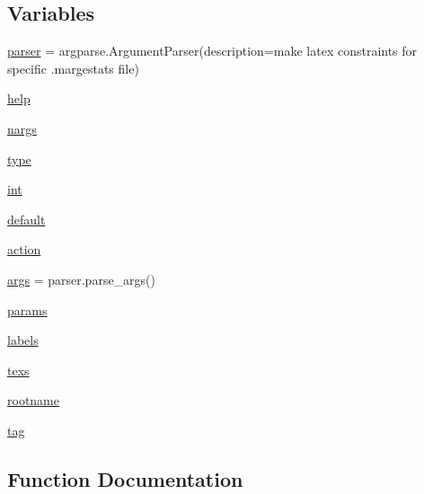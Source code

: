 \subsection*{Variables}
\begin{DoxyCompactItemize}
\item 
\mbox{\hyperlink{namespacemakeLatex_ad3a67b9142b2728f716b8460ccb4eac1}{parser}} = argparse.\+Argument\+Parser(description=\textquotesingle{}make latex constraints for specific .margestats file\textquotesingle{})
\item 
\mbox{\hyperlink{namespacemakeLatex_a10dbd3201e36be76e947439d4370e41a}{help}}
\item 
\mbox{\hyperlink{namespacemakeLatex_ab490d5bebd68c0103f81a1a91145f785}{nargs}}
\item 
\mbox{\hyperlink{namespacemakeLatex_acd498b031db2c0c78b202e5392c31387}{type}}
\item 
\mbox{\hyperlink{namespacemakeLatex_a288e618c65367042765edd4eafba1cfe}{int}}
\item 
\mbox{\hyperlink{namespacemakeLatex_a129a1b09cf1bd9155aad7d4982dda07d}{default}}
\item 
\mbox{\hyperlink{namespacemakeLatex_a4bc0ea4fe13f8469fa97a3d52ead2380}{action}}
\item 
\mbox{\hyperlink{namespacemakeLatex_a4e09dfb48ae1e3689fa69bd6c560e5b9}{args}} = parser.\+parse\+\_\+args()
\item 
\mbox{\hyperlink{namespacemakeLatex_a7def07e6bedf3e40f865067a2c8baa69}{params}}
\item 
\mbox{\hyperlink{namespacemakeLatex_ac1133cc6fd069419bc07c737df640a88}{labels}}
\item 
\mbox{\hyperlink{namespacemakeLatex_aa1b11d17d766fdf9e5c87e13fab6dd2f}{texs}}
\item 
\mbox{\hyperlink{namespacemakeLatex_a70da0cc442552b58d69b71d317ee6c48}{rootname}}
\item 
\mbox{\hyperlink{namespacemakeLatex_ae0994c8e085952238b42e4dc4d2cdf57}{tag}}
\end{DoxyCompactItemize}


\subsection{Function Documentation}
\mbox{\label{namespacemakeLatex_aaf761aac14c432e9140137d2658a53cf}} 
